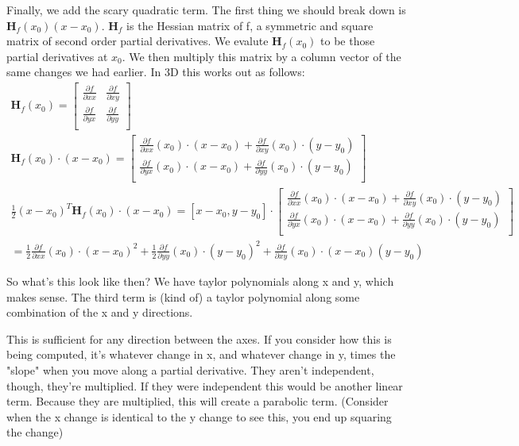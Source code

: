\documentclass[12pt, letterpaper]{article}
\begin{document}
Finally, we add the scary quadratic term. The first thing we should break down is $\mathbf{H}_f(x_0)(x-x_0)$. $\mathbf{H}_f$ is the Hessian matrix of f, a symmetric and square matrix of second order partial derivatives.
We evalute $\mathbf{H}_f(x_0)$ to be those partial derivatives at $x_0$. We then multiply this matrix by a column vector of the same changes we had earlier. In 3D this works out as follows:
\begin{gather*}
    \mathbf{H}_f(x_0) = \begin{bmatrix}
        \frac{\partial f}{\partial xx} & \frac{\partial f}{\partial xy}\\
        \frac{\partial f}{\partial yx} & \frac{\partial f}{\partial yy}\\
    \end{bmatrix}\\
    \mathbf{H}_f(x_0) \cdot (x - x_0) = \begin{bmatrix}
        \frac{\partial f}{\partial xx}(x_0) \cdot (x - x_0) + \frac{\partial f}{\partial xy}(x_0) \cdot (y-y_0)\\
        \frac{\partial f}{\partial yx}(x_0) \cdot (x - x_0) + \frac{\partial f}{\partial yy}(x_0) \cdot (y-y_0)\\ 
    \end{bmatrix}\\
    \frac{1}{2}(x-x_0)^T\mathbf{H}_f(x_0) \cdot (x - x_0) = 
    [x-x_0, y-y_0] \cdot \begin{bmatrix}
        \frac{\partial f}{\partial xx}(x_0) \cdot (x - x_0) + \frac{\partial f}{\partial xy}(x_0) \cdot (y-y_0)\\
        \frac{\partial f}{\partial yx}(x_0) \cdot (x - x_0) + \frac{\partial f}{\partial yy}(x_0) \cdot (y-y_0)\\ 
    \end{bmatrix}\\
    = \frac{1}{2}\frac{\partial f}{\partial xx}(x_0) \cdot (x-x_0)^2 + \frac{1}{2}\frac{\partial f}{\partial yy}(x_0) \cdot (y-y_0)^2 + \frac{\partial f}{\partial xy}(x_0) \cdot (x-x_0)(y-y_0)
\end{gather*}

So what's this look like then? We have taylor polynomials along x and y, which makes sense. The third term is (kind of) a taylor polynomial along some combination of the x and y directions.

This is sufficient for any direction between the axes. If you consider how this is being computed, it's whatever change in x, and whatever change in y, times the "slope" when you move along a partial derivative. They aren't independent, though, they're multiplied. If they were independent this would be another linear term. Because they are multiplied, this will create a parabolic term. (Consider when the x change is identical to the y change to see this, you end up squaring the change)
\end{document}
